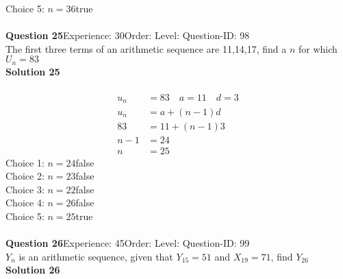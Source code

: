 \documentclass{article}
\begin{document}
Choice 5: \hspace{20pt}$n=36$\hspace{20pt}true\\
\\[4pt]
\noindent\textbf{Question 25}\hspace{20pt}Experience: 30\hspace{20pt}Order: \hspace{20pt}Level: \hspace{20pt}Question-ID: 98\\[2pt]
The first three terms of an arithmetic sequence are 11,14,17, find a $n$ for which $U_n=83$\\[4pt]
\noindent\textbf{Solution 25}\\[2pt]
\\[-35pt]\begin{align*}
u_n&=83 \quad a=11 \quad d=3\\[2pt]
u_n&=a+(n-1)d\\[2pt]
83&=11+(n-1)3\\[2pt]
n-1&=24\\[2pt]
n&=25
\end{align*}
Choice 1: \hspace{20pt}$n=24$\hspace{20pt}false\\
Choice 2: \hspace{20pt}$n=23$\hspace{20pt}false\\
Choice 3: \hspace{20pt}$n=22$\hspace{20pt}false\\
Choice 4: \hspace{20pt}$n=26$\hspace{20pt}false\\
Choice 5: \hspace{20pt}$n=25$\hspace{20pt}true\\
\\[4pt]
\noindent\textbf{Question 26}\hspace{20pt}Experience: 45\hspace{20pt}Order: \hspace{20pt}Level: \hspace{20pt}Question-ID: 99\\[2pt]
$Y_n$ is an arithmetic sequence, given that $Y_{15}=51$ and $X_{19}=71$, find $Y_{26}$\\[4pt]
\noindent\textbf{Solution 26}\\[2pt]
\end{document}
